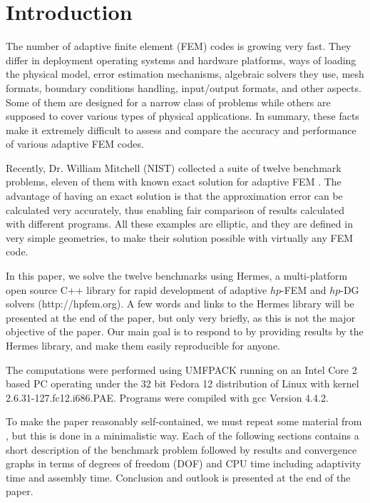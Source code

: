 \documentclass[12pt]{elsarticle}
\begin{document}
\section{Introduction}
\label{sec:intro}

The number of adaptive finite element (FEM) codes is growing very fast.
They differ in deployment operating systems and hardware platforms,
ways of loading the physical model, error estimation mechanisms,
algebraic solvers they use, mesh formats, boundary conditions
handling, input/output formats, and other aspects. Some of them are
designed for a narrow class of problems while others are supposed to
cover various types of physical applications. In summary, these facts
make it extremely difficult to assess and compare the accuracy and
performance of various adaptive FEM codes.

Recently, Dr. William Mitchell (NIST) collected a suite of
twelve benchmark problems, eleven of them with known exact solution for adaptive
FEM \cite{mitchell-1}. The advantage of having an exact solution is that
the approximation error can be calculated very accurately, thus
enabling fair comparison of results calculated with different
programs. All these examples are elliptic, and they are defined
in very simple geometries, to make their solution possible with
virtually any FEM code.

In this paper, we solve the twelve benchmarks using
Hermes, a multi-platform open source C++
library for rapid development of adaptive $hp$-FEM
and $hp$-DG solvers (http://hpfem.org). A few words
and links to the Hermes library will be presented at the
end of the paper, but only very briefly, as this is not
the major objective of the paper. Our main goal is to
respond to \cite{mitchell-1} by providing results by
the Hermes library, and make them easily reproducible
for anyone.

The computations were performed using UMFPACK
running on an Intel Core 2 based PC operating
under the 32 bit Fedora 12 distribution of Linux with kernel 2.6.31-127.fc12.i686.PAE.
Programs were compiled with gcc Version 4.4.2.

To make the paper reasonably self-contained, we must repeat some
material from \cite{mitchell-1}, but this is done in a minimalistic way.
Each of the following sections contains a short description of
the benchmark problem followed by results and convergence graphs in terms of degrees
of freedom (DOF) and CPU time including adaptivity time and assembly time.
Conclusion and outlook is presented at the end of the paper.
\end{document}
